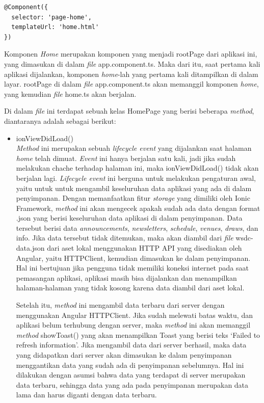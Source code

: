 \begin{enumerate}
\begin{enumerate}
\begin{lstlisting}[label={lst:componenthome}, caption=@Component pada home.ts]
@Component({
  selector: 'page-home',
  templateUrl: 'home.html'
})
\end{lstlisting}	
	
	Komponen \textit{Home} merupakan komponen yang menjadi rootPage dari aplikasi ini, yang dimasukan di dalam \textit{file} app.component.ts. Maka dari itu, saat pertama kali aplikasi dijalankan, komponen \textit{home}-lah yang pertama kali ditampilkan di dalam layar. rootPage di dalam \textit{file} app.component.ts akan memanggil komponen \textit{home}, yang kemudian \textit{file} home.ts akan berjalan. 
	
	Di dalam \textit{file} ini terdapat sebuah kelas HomePage yang berisi beberapa \textit{method}, diantaranya adalah sebagai berikut:
	
	\begin{itemize}
		\item ionViewDidLoad() \\
		\textit{Method} ini merupakan sebuah \textit{lifecycle event} yang dijalankan saat halaman \textit{home} telah dimuat. \textit{Event} ini hanya berjalan satu kali, jadi jika sudah melakukan chache terhadap halaman ini, maka ionViewDidLoad() tidak akan berjalan lagi. \textit{Lifecycle event} ini berguna untuk melakukan pengaturan awal, yaitu untuk untuk mengambil keseluruhan data aplikasi yang ada di dalam penyimpanan. Dengan memanfaatkan fitur \textit{storage} yang dimiliki oleh Ionic Framework, \textit{method} ini akan mengecek apakah sudah ada data dengan format .json yang berisi keseluruhan data aplikasi di dalam penyimpanan. Data tersebut berisi data \textit{announcements}, \textit{newsletters}, \textit{schedule}, \textit{venues}, \textit{draws}, dan info. Jika data tersebut tidak ditemukan, maka akan diambil dari \textit{file} wsdc-data.json dari aset lokal menggunakan HTTP API yang disediakan oleh Angular, yaitu HTTPClient, kemudian dimasukan ke dalam penyimpanan. Hal ini bertujuan jika pengguna tidak memiliki koneksi internet pada saat pemasangan aplikasi, aplikasi masih bisa dijalankan dan menampilkan halaman-halaman yang tidak kosong karena data diambil dari aset lokal.
		
		Setelah itu, \textit{method} ini mengambil data terbaru dari server dengan menggunakan Angular HTTPClient. Jika sudah melewati batas waktu, dan aplikasi belum terhubung dengan server, maka \textit{method} ini akan memanggil \textit{method} showToast() yang akan menampilkan Toast yang berisi teks `Failed to refresh information'. Jika mengambil data dari server berhasil, maka data yang didapatkan dari server akan dimasukan ke dalam penyimpanan menggantikan data yang sudah ada di penyimpanan sebelumnya. Hal ini dilakukan dengan asumsi bahwa data yang terdapat di server merupakan data terbaru, sehingga data yang ada pada penyimpanan merupakan data lama dan harus diganti dengan data terbaru.
	

\end{itemize}
\end{enumerate}
\end{enumerate}
